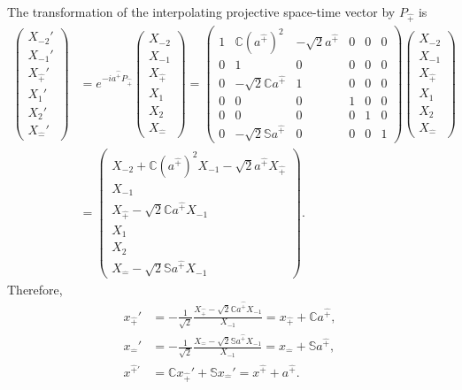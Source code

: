 \documentclass[foundations,article,submit,pdftex,moreauthors]{Definitions/mdpi}
\begin{document}
The transformation of the interpolating projective space-time vector by
$P_{\hat{+}}$ is
\begin{align}
\begin{pmatrix}
X_{-2}'\\ X_{-1}'\\ X_{\hat{+}}'\\ X_1'\\ X_2'\\ X_{\hat{-}}'
\end{pmatrix}
&=e^{-ia^{\hat{+}}P_{\hat{+}}}
\begin{pmatrix}
X_{-2}\\ X_{-1}\\ X_{\hat{+}}\\ X_1\\ X_2\\ X_{\hat{-}}
\end{pmatrix}
=\begin{pmatrix}
1 & \mathbb{C} (a^{\hat{+}})^{2} & - \sqrt{2} a^{\hat{+}} & 0 & 0 & 0\\
0 & 1 & 0 & 0 & 0 & 0\\
0 & - \sqrt{2} \mathbb{C} a^{\hat{+}} & 1 & 0 & 0 & 0\\
0 & 0 & 0 & 1 & 0 & 0\\
0 & 0 & 0 & 0 & 1 & 0\\
0 & - \sqrt{2} \mathbb{S} a^{\hat{+}} & 0 & 0 & 0 & 1
\end{pmatrix}
\begin{pmatrix}
X_{-2}\\ X_{-1}\\ X_{\hat{+}}\\ X_1\\ X_2\\ X_{\hat{-}}
\end{pmatrix}\\
&=\begin{pmatrix}
X_{-2}+\mathbb{C}(a^{\hat{+}})^2X_{-1}
-\sqrt{2}a^{\hat{+}}X_{\hat{+}}\\
X_{-1}\\
X_{\hat{+}}-\sqrt{2}\mathbb{C}a^{\hat{+}}X_{-1}\\
X_1\\ X_2\\
X_{\hat{-}}-\sqrt{2}\mathbb{S}a^{\hat{+}}X_{-1}
\end{pmatrix}.
\end{align}
Therefore,
\begin{align}
x_{\hat{+}}'
&=-\frac{1}{\sqrt{2}}\frac{X_{\hat{+}}-\sqrt{2}\mathbb{C}a^{\hat{+}}X_{-1}}{X_{-1}}
=x_{\hat{+}}+\mathbb{C}a^{\hat{+}}, \nonumber\\
x_{\hat{-}}'
&=-\frac{1}{\sqrt{2}}\frac{X_{\hat{-}}-\sqrt{2}\mathbb{S}a^{\hat{+}}X_{-1}}{X_{-1}}
=x_{\hat{-}}+\mathbb{S}a^{\hat{+}}, \nonumber\\
x^{\hat{+}\prime}
&=\mathbb{C}x_{\hat{+}}'+\mathbb{S}x_{\hat{-}}'
=x^{\hat{+}}+a^{\hat{+}}.
\end{align}
\end{document}
